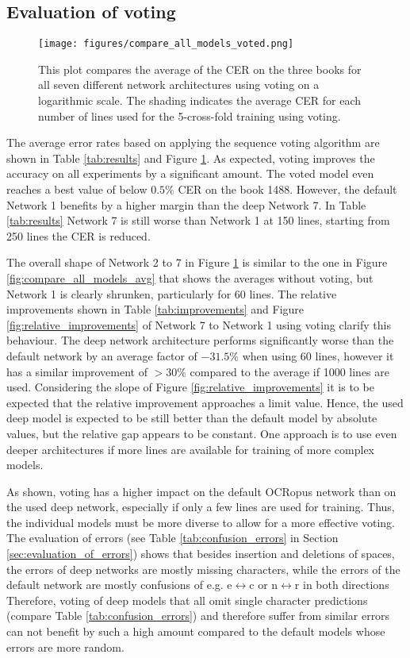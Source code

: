 \documentclass{jlcl}
\begin{document}
\subsection{Evaluation of voting}
\label{sec:evaluation_of_voting}

\begin{figure}[t]
    \centering
    \texttt{[image: figures/compare\_all\_models\_voted.png]}
    \caption{This plot compares the average of the CER on the three books for all seven different network architectures using voting on a logarithmic scale. The shading indicates the average CER for each number of lines used for the 5-cross-fold training using voting.}
    \label{fig:compare_all_models_voted}
\end{figure}

The average error rates based on applying the sequence voting algorithm are shown in Table \ref{tab:results} and Figure \ref{fig:compare_all_models_voted}.
As expected, voting improves the accuracy on all experiments by a significant amount.
The voted model even reaches a best value of below $0.5\%$ CER on the book 1488.
However, the default Network 1 benefits by a higher margin than the deep Network 7.
In Table \ref{tab:results} Network 7 is still worse than Network 1 at 150 lines, starting from 250 lines the CER is reduced.

The overall shape of Network 2 to 7 in Figure \ref{fig:compare_all_models_voted} is similar to the one in Figure \ref{fig:compare_all_models_avg} that shows the averages without voting, but Network 1 is clearly shrunken, particularly for 60 lines.
The relative improvements shown in Table \ref{tab:improvements} and Figure \ref{fig:relative_improvements} of Network 7 to Network 1 using voting clarify this behaviour.
The deep network architecture performs significantly worse than the default network by an average factor of $-31.5\%$ when using 60 lines, however it has a similar improvement of $>30\%$ compared to the average if 1000 lines are used.
Considering the slope of Figure \ref{fig:relative_improvements} it is to be expected that the relative improvement approaches a limit value.
Hence, the used deep model is expected to be still better than the default model by absolute values, but the relative gap appears to be constant.
One approach is to use even deeper architectures if more lines are available for training of more complex models.

As shown, voting has a higher impact on the default OCRopus network than on the used deep network, especially if only a few lines are used for training.
Thus, the individual models must be more diverse to allow for a more effective voting.
The evaluation of errors (see Table \ref{tab:confusion_errors} in Section \ref{sec:evaluation_of_errors}) shows that besides insertion and deletions of spaces, the errors of deep networks are mostly missing characters, while the errors of the default network are mostly confusions of e.g. e$\leftrightarrow$c or n$\leftrightarrow$r in both directions
Therefore, voting of deep models that all omit single character predictions (compare Table \ref{tab:confusion_errors}) and therefore suffer from similar errors can not benefit by such a high amount compared to the default models whose errors are more random.
\end{document}
